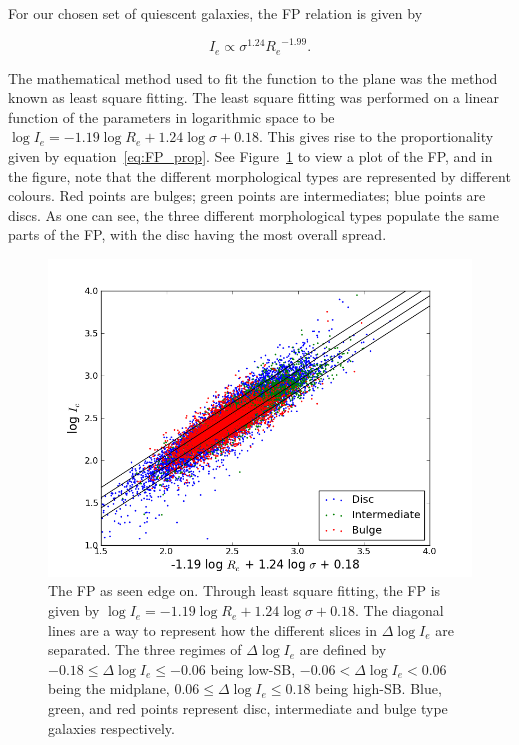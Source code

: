 \documentclass[showcase, preprintnumbers, amsmath, amssymb, bibnotes, 12pt]{revtex4}
\begin{document}
For our chosen set of quiescent galaxies, the FP relation is given by 

\begin{equation}
I_e \propto \sigma^{1.24} {R_e}^{-1.99}. 
\label{eq:FP_prop}
\end{equation}

\noindent The mathematical method used to fit the function to the plane was the method known as least square fitting. The least square fitting was performed on a linear function of the parameters in logarithmic space to be $\log I_e = -1.19 \log R_e + 1.24 \log \sigma + 0.18$. This gives rise to the proportionality given by equation~\ref{eq:FP_prop}. See Figure~\ref{fig:FP_morph} to view a plot of the FP, and in the figure, note that the different morphological types are represented by different colours. Red points are bulges; green points are intermediates; blue points are discs. As one can see, the three different morphological types populate the same parts of the FP, with the disc having the most overall spread.

\begin{figure}
\begin{center}
\includegraphics[scale=0.73]{FP_morph.png}
\end{center}
\caption{The FP as seen edge on. Through least square fitting, the FP is given by $\log{I_e}=-1.19\log{R_e}+1.24\log{\sigma}+0.18$. The diagonal lines are a way to represent how the different slices in $\Delta\log{I_e}$ are separated. The three regimes of $\Delta\log{I_e}$ are defined by $-0.18\le\Delta\log{I_e}\le-0.06$ being low-SB, $-0.06<\Delta\log{I_e}<0.06$ being the midplane, $0.06\le\Delta\log{I_e}\le0.18$ being high-SB. Blue, green, and red points represent disc, intermediate and bulge type galaxies respectively. \label{fig:FP_morph}}
\end{figure}
\end{document}
